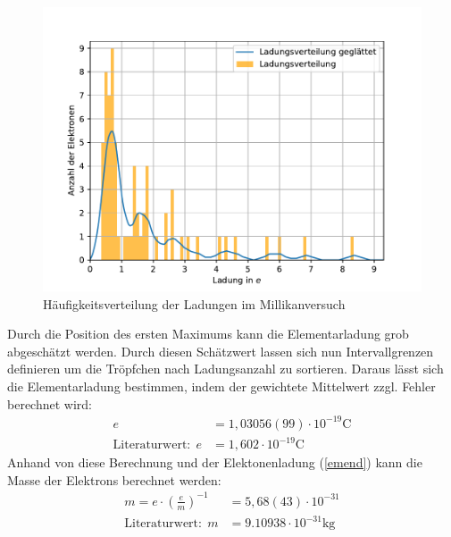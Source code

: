 \documentclass[11pt, a4paper]{article}
\begin{document}
    \begin{figure}[h]
        \centering
        \includegraphics[width=\textwidth]{Ladungsverteilung.pdf}
        \caption{Häufigkeitsverteilung der Ladungen im Millikanversuch}
        \label{fig:hauf}
    \end{figure}
    
    Durch die Position des ersten Maximums kann die Elementarladung grob abgeschätzt werden. Durch diesen Schätzwert lassen sich nun Intervallgrenzen definieren um die Tröpfchen nach Ladungsanzahl zu sortieren.
    Daraus lässt sich die Elementarladung bestimmen, indem der gewichtete Mittelwert zzgl. Fehler berechnet\cite[Kapitel 5]{ABW} wird:
    \begin{align}
        e &= 1,03056(99) \cdot 10^{-19} \si{\coulomb} \\
        \text{Literaturwert:} \ \ e &= 1,602 \cdot 10^{-19} \si{\coulomb}
    \end{align}
    Anhand von diese Berechnung und der Elektonenladung (\ref{emend}) kann die Masse der Elektrons berechnet werden:
    \begin{align}
        m = e \cdot \left(\frac{e}{m}\right)^{-1} &= 5,68(43) \cdot 10^{-31}\\
        \text{Literaturwert:} \ \ m &= 9.10938 \cdot 10^{-31} \si{\kilogram}
    \end{align}
\end{document}
